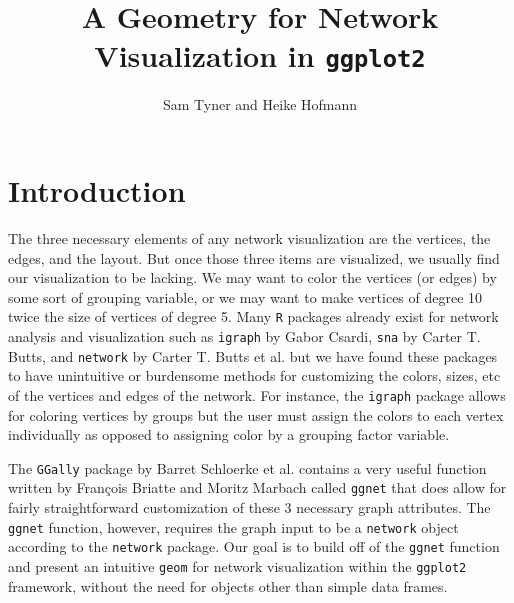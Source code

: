 \documentclass[11pt]{article}\usepackage[]{graphicx}\usepackage[]{color}
\title{A Geometry for Network Visualization in \MakeLowercase{\texttt{ggplot2}}}
\author{Sam Tyner and Heike Hofmann}
\date{} %
\begin{document}
\maketitle

\section{Introduction}
\par The three necessary elements of any network visualization are the vertices, the edges, and the layout.  But once those three items are visualized, we usually find our visualization to be lacking.  We may want to color the vertices (or edges) by some sort of grouping variable, or we may want to make vertices of degree 10 twice the size of vertices of degree 5.  Many \texttt{R} packages already exist for network analysis and visualization such as \texttt{igraph} by Gabor Csardi, \texttt{sna} by Carter T. Butts, and \texttt{network} by Carter T. Butts et al. but we have found these packages to have unintuitive or burdensome methods for customizing the colors, sizes, etc of the vertices and edges of the network. For instance, the \texttt{igraph} package allows for coloring vertices by groups but the user must assign the colors to each vertex individually as opposed to assigning color by a grouping factor variable. \\

\par The \texttt{GGally} package by Barret Schloerke et al. contains a very useful function written by Fran\c{c}ois Briatte and Moritz Marbach called \texttt{ggnet} that does allow for fairly straightforward customization of these 3 necessary graph attributes.  The \texttt{ggnet} function, however, requires the graph input to be a \texttt{network} object according to the \texttt{network} package.  Our goal is to build off of the \texttt{ggnet} function and present an intuitive \texttt{geom} for network visualization within the \texttt{ggplot2} framework, without the need for objects other than simple data frames.  
\end{document}
